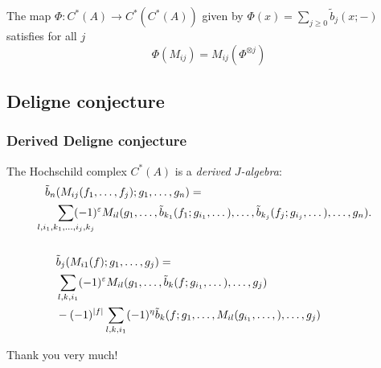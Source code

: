 \documentclass{beamer}
\theoremstyle{definition}
\begin{document}
\begin{frame}
\begin{corollary}
The map $\Phi:C^*(A)\to C^*(C^*(A))$ given by $\Phi(x)= \sum_{j\geq 0} \tilde{b}_j(x;-)$ satisfies for all $j$
\[\Phi(M_{ij}) = M_{ij}(\Phi^{\otimes j})\]
\end{corollary}
\end{frame}

\subsection{Deligne conjecture}
\begin{frame}
\frametitle{Derived Deligne conjecture}
\begin{theorem} %
The Hochschild complex $C^*(A)$ is a \emph{derived $J$-algebra}:
\begin{align*}
\tilde{b}_n&(M_{ij}(f_1,\dots, f_j);g_1,\dots, g_n)=\\
&\sum_{\mathclap{l,i_1,k_1,\dots, i_j,k_j}}(-1)^{\varepsilon}M_{il}(g_1,\dots, \tilde{b}_{k_1}(f_1;g_{i_1},\dots),\dots, \tilde{b}_{k_j}(f_j;g_{i_j},\dots),\dots, g_n).\\ 
\\
&\tilde{b}_j(M_{i1}(f);g_1,\dots, g_j)=\\
&\sum_{l,k,i_1}(-1)^{\varepsilon}M_{il}(g_1,\dots, \tilde{b}_{k}(f;g_{i_1},\dots),\dots, g_j)\\
&-(-1)^{|f|}\sum_{l,k,i_1} (-1)^{\eta} \tilde{b}_k(f;g_1,\dots, M_{il}(g_{i_1},\dots,), \dots, g_j)
\end{align*}
\end{theorem}
\end{frame}



\begin{frame}
\begin{center}
\Huge{Thank you very much!}
\end{center}
\end{frame}
\end{document}
